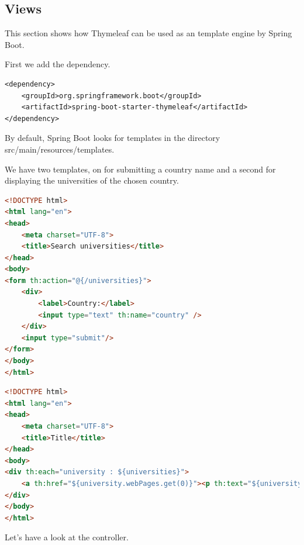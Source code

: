 \subsection{Views}

This section shows how Thymeleaf can be used as an template engine by Spring Boot.

First we add the dependency.

\begin{lstlisting}[frame=single]
<dependency>
	<groupId>org.springframework.boot</groupId>
	<artifactId>spring-boot-starter-thymeleaf</artifactId>
</dependency>
\end{lstlisting}

By default, Spring Boot looks for  templates in the directory src/main/resources/templates. 

We have two templates,  on for submitting a country name and a second for displaying the universities of the chosen country. 

\begin{lstlisting}[language=html, frame=single]
<!DOCTYPE html>
<html lang="en">
<head>
	<meta charset="UTF-8">
	<title>Search universities</title>
</head>
<body>
<form th:action="@{/universities}">
	<div>
		<label>Country:</label>
		<input type="text" th:name="country" />
	</div>
	<input type="submit"/>
</form>
</body>
</html>
\end{lstlisting}

\begin{lstlisting}[language=html, frame=single]
<!DOCTYPE html>
<html lang="en">
<head>
	<meta charset="UTF-8">
	<title>Title</title>
</head>
<body>
<div th:each="university : ${universities}">
	<a th:href="${university.webPages.get(0)}"><p th:text="${university.name}"></a>
</div>
</body>
</html>
\end{lstlisting}

Let's have a look at the controller.

